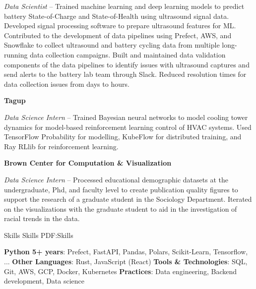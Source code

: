 \documentclass[letterpaper,MMMyyyy,nonstopmode]{simpleresumecv}
\begin{document}
\begin{Body}
\BulletItem \textit{Data Scientist}
\hfill
{} -- 
\SubBulletItem
Trained machine learning and deep learning models to predict battery State-of-Charge and State-of-Health using ultrasound signal data. Developed signal processing software to prepare ultrasound features for ML.
\SubBulletItem
Contributed to the development of data pipelines using Prefect, AWS, and Snowflake to collect ultrasound and battery cycling data from multiple long-running data collection campaigns.
\SubBulletItem
Built and maintained data validation components of the data pipelines to identify issues with ultrasound captures and send alerts to the battery lab team through Slack. Reduced resolution times for data collection issues from days to hours.

\BigGap

\Entry \textbf{Tagup}

\Gap

\BulletItem \textit{Data Science Intern}
\hfill
{} -- 
\SubBulletItem
Trained Bayesian neural networks to model cooling tower dynamics for model-based reinforcement learning control of HVAC systems. Used TensorFlow Probability for modelling, KubeFlow for distributed training, and Ray RLlib for reinforcement learning.

\BigGap

\Entry \textbf{Brown Center for Computation \& Visualization}

\Gap
  
\BulletItem \textit{Data Science Intern}
\hfill
{} -- 
\SubBulletItem
Processed educational demographic datasets at the undergraduate, Phd, and faculty level to create publication quality figures to support the research of a graduate student in the Sociology Department. Iterated on the visualizations with the graduate student to aid in the investigation of racial trends in the data.



\Section
{Skills}
{Skills}
{PDF:Skills}

\Entry
\textbf{Python 5+ years}: Prefect, FastAPI, Pandas, Polars, Scikit-Learn, Tensorflow, ...
\Entry 
\textbf{Other Languages}: Rust, JavaScript (React)
\Entry
\textbf{Tools \& Technologies}: SQL, Git, AWS, GCP, Docker, Kubernetes
\Entry
\textbf{Practices}: Data engineering, Backend development, Data science


\end{Body}
\end{document}
